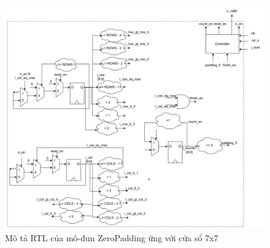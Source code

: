 \begin{figure}[!ht]
    \centering
    \includegraphics[width=\linewidth]{figures/zero7x7Architecture1.png}
    \caption{Mô tả RTL của mô-đun ZeroPadding ứng với cửa sổ 7x7}
    \label{fig:zero7x7Architecture1}
\end{figure}

\renewcommand{\arraystretch}{1}


